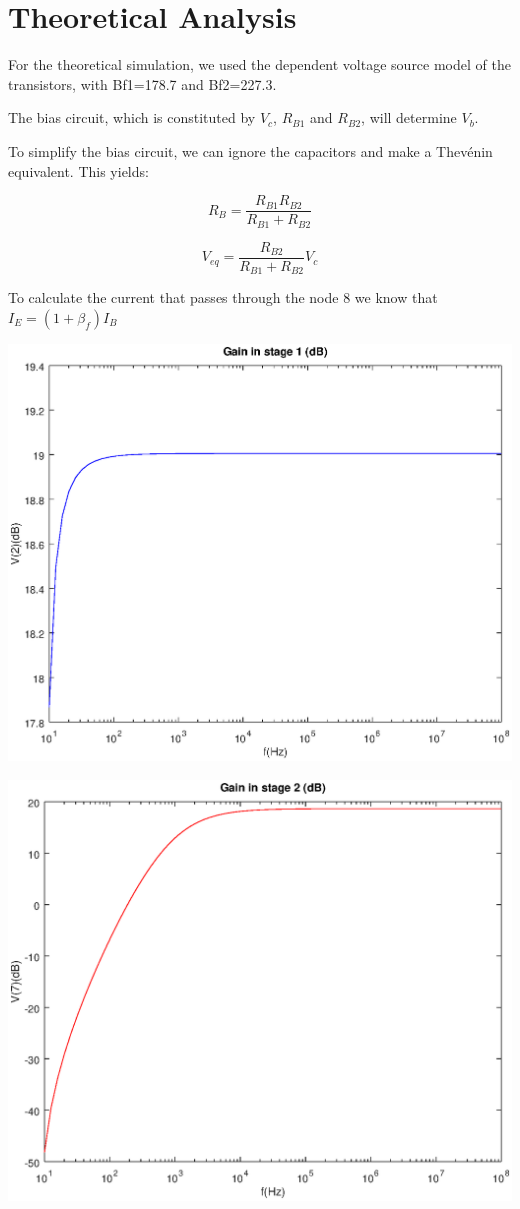 \section{Theoretical Analysis}
\label{sec:analysis}

For the theoretical simulation, we used the dependent voltage source model of the transistors, with Bf1=178.7 and Bf2=227.3.

The bias circuit, which is constituted by $V_c$, $R_{B1}$ and $R_{B2}$, will determine $V_b$.

To simplify the bias circuit, we can ignore the capacitors and make a Thevénin equivalent. This yields:

\begin{equation}
	R_B=\frac{R_{B1} R_{B2}}{R_{B1}+R_{B2}}
\end{equation}

\begin{equation}
	V_{eq}= \frac{R_{B2}}{R_{B1}+R_{B2}} V_{c}
\end{equation}

To calculate the current that passes through the node 8 we know that $I_E= (1+\beta_f)I_B$

\includegraphics[width=1\linewidth]{vo1.eps}

\includegraphics[width=1\linewidth]{vo2.eps}


